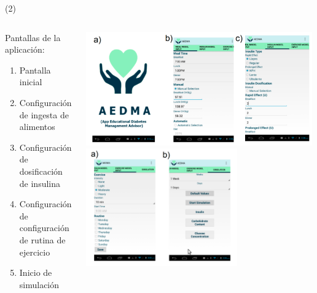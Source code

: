 \begin{frame}{ (2)}
\begin{columns}
\begin{column}{0.65\textwidth}
Pantallas de la aplicación:
	\begin{enumerate}
\item Pantalla inicial
\item Configuración de ingesta de alimentos
\item Configuración de dosificación de insulina
\item Configuración de configuración de rutina de ejercicio
\item Inicio de simulación
	\end{enumerate}
\end{column}
\begin{column}{0.40\textwidth}
\begin{center}
     \includegraphics[width=0.99\textwidth]{Figs/Diabetes3}
     \includegraphics[width=0.66\textwidth]{Figs/Diabetes4}
     \end{center}
\end{column}
\end{columns}
\end{frame}


